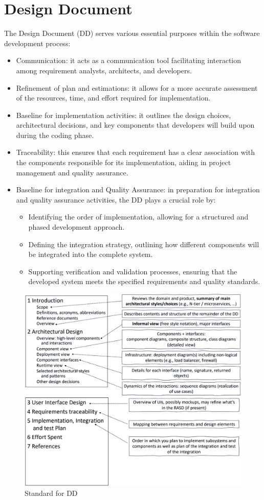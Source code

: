 \section{Design Document}

The Design Document (DD) serves various essential purposes within the software development process:
\begin{itemize}
    \item Communication: it acts as a communication tool facilitating interaction among requirement analysts, architects, and developers. 
    \item Refinement of plan and estimations: it allows for a more accurate assessment of the resources, time, and effort required for implementation.
    \item Baseline for implementation activities: it outlines the design choices, architectural decisions, and key components that developers will build upon during the coding phase.
    \item Traceability: this ensures that each requirement has a clear association with the components responsible for its implementation, aiding in project management and quality assurance.
    \item Baseline for integration and Quality Assurance: in preparation for integration and quality assurance activities, the DD plays a crucial role by:
        \begin{itemize}
            \item Identifying the order of implementation, allowing for a structured and phased development approach.
            \item Defining the integration strategy, outlining how different components will be integrated into the complete system.
            \item Supporting verification and validation processes, ensuring that the developed system meets the specified requirements and quality standards.
        \end{itemize}
\end{itemize}
\begin{figure}[H]
    \centering
    \includegraphics[width=0.5\linewidth]{images/dd.png}
    \caption{Standard for DD}
\end{figure}